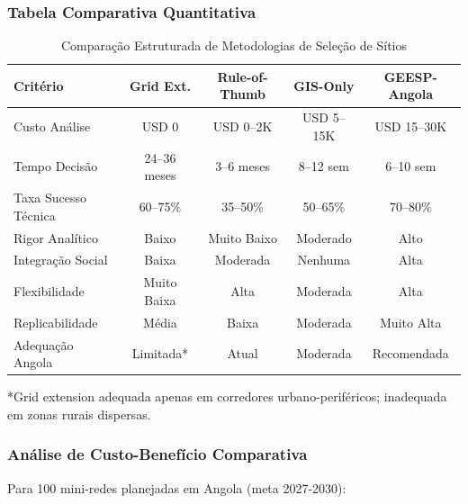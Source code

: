 \documentclass[12pt, a4paper]{article}
\begin{document}
\subsubsection{Tabela Comparativa Quantitativa}

\begin{table}[H]
\centering
\caption{Comparação Estruturada de Metodologias de Seleção de Sítios}
\label{tab:methodology_comparison}
\small
\begin{tabular}{|l|c|c|c|c|}
\hline
\textbf{Critério} & \textbf{Grid Ext.} & \textbf{Rule-of-Thumb} & \textbf{GIS-Only} & \textbf{GEESP-Angola} \\
\hline
Custo Análise & USD 0 & USD 0--2K & USD 5--15K & USD 15--30K \\
\hline
Tempo Decisão & 24--36 meses & 3--6 meses & 8--12 sem & 6--10 sem \\
\hline
Taxa Sucesso Técnica & 60--75\% & 35--50\% & 50--65\% & 70--80\% \\
\hline
Rigor Analítico & Baixo & Muito Baixo & Moderado & Alto \\
\hline
Integração Social & Baixa & Moderada & Nenhuma & Alta \\
\hline
Flexibilidade & Muito Baixa & Alta & Moderada & Alta \\
\hline
Replicabilidade & Média & Baixa & Moderada & Muito Alta \\
\hline
Adequação Angola & Limitada* & Atual & Moderada & Recomendada \\
\hline
\end{tabular}
\end{table}

*Grid extension adequada apenas em corredores urbano-periféricos; inadequada em zonas rurais dispersas.

\subsubsection{Análise de Custo-Benefício Comparativa}

Para 100 mini-redes planejadas em Angola (meta 2027-2030):
\end{document}
